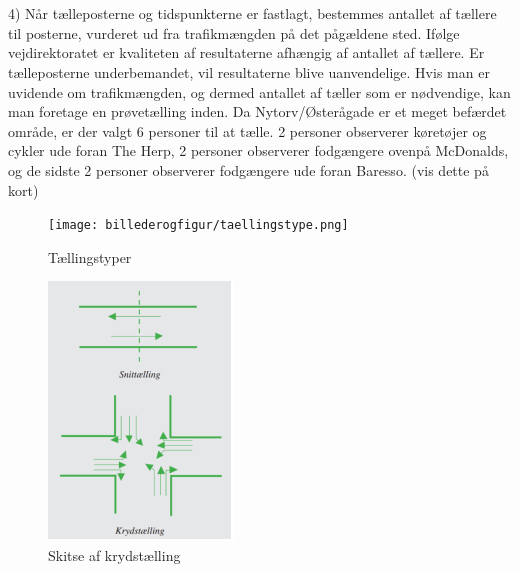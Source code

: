 \\\\
4) Når tælleposterne og tidspunkterne er fastlagt, bestemmes antallet af tællere til posterne, vurderet ud fra trafikmængden på det pågældene sted. Ifølge vejdirektoratet er kvaliteten af resultaterne afhængig af antallet af tællere. Er tælleposterne underbemandet, vil resultaterne blive uanvendelige. Hvis man er uvidende om trafikmængden, og dermed antallet af tæller som er nødvendige, kan man foretage en prøvetælling inden. Da Nytorv/Østerågade er et meget befærdet område, er der valgt 6 personer til at tælle. 2 personer observerer køretøjer og cykler ude foran The Herp, 2 personer observerer fodgængere ovenpå McDonalds, og de sidste 2 personer observerer fodgængere ude foran Baresso. (vis dette på kort)

\begin{figure}[htbp]
   \label{fig:taellingstype}
   \centering
   \begin{adjustbox}{max width=\textwidth}
     \texttt{[image: billederogfigur/taellingstype.png]}
  \end{adjustbox}
   \caption{Tællingstyper}
 \end{figure}

 \begin{figure}[htbp]
   \label{fig:krydstaelling}
   \centering
   \begin{adjustbox}{max width=\textwidth}
     \includegraphics[scale=1]{billederogfigur/krydstaelling.png}
  \end{adjustbox}
   \caption{Skitse af krydstælling}
 \end{figure}


